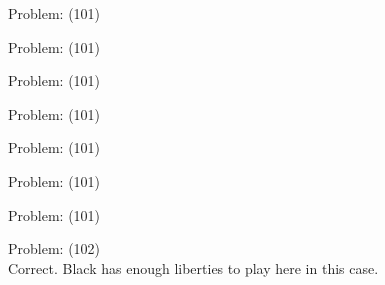 \documentclass[11pt]{article}
\begin{document}
\begin{minipage}[t]{0.5\textwidth}
  {\centering
  
Problem: (101)\\
  }
\end{minipage}
\begin{minipage}[t]{0.5\textwidth}
  {\centering
  
Problem: (101)\\
  }
\end{minipage}
\begin{minipage}[t]{0.5\textwidth}
  {\centering
  
Problem: (101)\\
  }
\end{minipage}
\begin{minipage}[t]{0.5\textwidth}
  {\centering
  
Problem: (101)\\
  }
\end{minipage}
\begin{minipage}[t]{0.5\textwidth}
  {\centering
  
Problem: (101)\\
  }
\end{minipage}
\begin{minipage}[t]{0.5\textwidth}
  {\centering
  
Problem: (101)\\
  }
\end{minipage}
\begin{minipage}[t]{0.5\textwidth}
  {\centering
  
Problem: (101)\\
  }
\end{minipage}
\begin{minipage}[t]{0.5\textwidth}
  {\centering
  
Problem: (102)\\
Correct. Black has enough liberties to play here in this case.\\
  }
\end{minipage}
\end{document}
